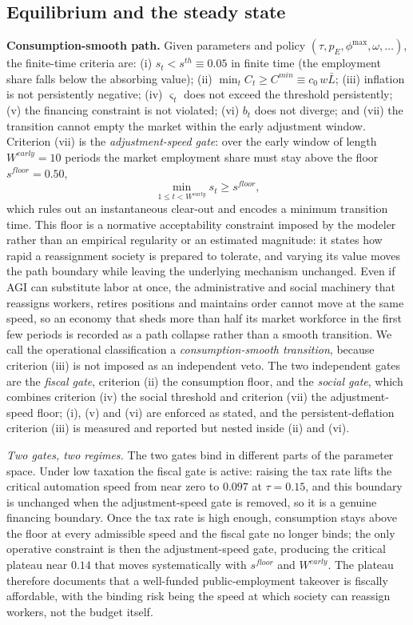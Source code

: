 \documentclass[review,12pt]{elsarticle}
\theoremstyle{plain}
\theoremstyle{definition}
\theoremstyle{remark}
\newcommand{\barL}{\bar{L}}
\begin{document}
\subsection{Equilibrium and the steady state}
\textbf{Consumption-smooth path.} Given parameters and policy $(\tau,p_E,\phi^{\max},\omega,\dots)$, the finite-time criteria are: (i) $s_t<s^{th}\equiv0.05$ in finite time (the employment share falls below the absorbing value); (ii) $\min_t C_t\ge C^{min}\equiv c_0\,w\barL$; (iii) inflation is not persistently negative; (iv) $\varsigma_t$ does not exceed the threshold persistently; (v) the financing constraint is not violated; (vi) $b_t$ does not diverge; and (vii) the transition cannot empty the market within the early adjustment window. Criterion (vii) is the \emph{adjustment-speed gate}: over the early window of length $W^{early}=10$ periods the market employment share must stay above the floor $s^{floor}=0.50$,
\begin{equation}
\min_{1\le t<W^{early}} s_t \ge s^{floor},
\end{equation}
which rules out an instantaneous clear-out and encodes a minimum transition time. This floor is a normative acceptability constraint imposed by the modeler rather than an empirical regularity or an estimated magnitude: it states how rapid a reassignment society is prepared to tolerate, and varying its value moves the path boundary while leaving the underlying mechanism unchanged. Even if AGI can substitute labor at once, the administrative and social machinery that reassigns workers, retires positions and maintains order cannot move at the same speed, so an economy that sheds more than half its market workforce in the first few periods is recorded as a path collapse rather than a smooth transition. We call the operational classification a \emph{consumption-smooth transition}, because criterion (iii) is not imposed as an independent veto. The two independent gates are the \emph{fiscal gate}, criterion (ii) the consumption floor, and the \emph{social gate}, which combines criterion (iv) the social threshold and criterion (vii) the adjustment-speed floor; (i), (v) and (vi) are enforced as stated, and the persistent-deflation criterion (iii) is measured and reported but nested inside (ii) and (vi).

\smallskip\noindent\emph{Two gates, two regimes.} The two gates bind in different parts of the parameter space. Under low taxation the fiscal gate is active: raising the tax rate lifts the critical automation speed from near zero to $0.097$ at $\tau=0.15$, and this boundary is unchanged when the adjustment-speed gate is removed, so it is a genuine financing boundary. Once the tax rate is high enough, consumption stays above the floor at every admissible speed and the fiscal gate no longer binds; the only operative constraint is then the adjustment-speed gate, producing the critical plateau near $0.14$ that moves systematically with $s^{floor}$ and $W^{early}$. The plateau therefore documents that a well-funded public-employment takeover is fiscally affordable, with the binding risk being the speed at which society can reassign workers, not the budget itself.
\end{document}
